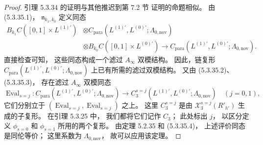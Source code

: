 \begin{proof}
引理 5.3.34 的证明与其他推迟到第 7.2 节
证明的命题相似。
由 (5.3.35.1)，
$\mathfrak n_{k_1,k_0}$ 定义同态
\begin{equation}
\begin{aligned}
B_{k_1}C([0,1]\times L^{(1)\prime})
&\otimes
C_{\mathrm{para}}
(L^{(1)\prime},L^{(0)\prime};
\Lambda_{0,\mathrm{nov}})\\
&\otimes
B_{k_0}C([0,1]\times L^{(0)\prime})
\longrightarrow
C_{\mathrm{para}}
(L^{(1)\prime},L^{(0)\prime};
\Lambda_{0,\mathrm{nov}}).
\end{aligned}
\tag{5.3.36}\label{eq:5-3-36}
\end{equation}
直接检查可知，
这些同态构成一个滤过
$A_\infty$ 双模结构。
因此，链复形
$C_{\mathrm{para}}
(L^{(1)\prime},L^{(0)\prime};
\Lambda_{0,\mathrm{nov}})$
上已有所需的滤过双模结构。
又由 (5.3.35.2)、(5.3.35.3)，
存在滤过 $A_\infty$ 双模同态
\[
\operatorname{Eval}_{s=j}\colon
C_{\mathrm{para}}
(L^{(1)\prime},L^{(0)\prime};
\Lambda_{0,\mathrm{nov}})
\longrightarrow
C_3^{s=j}
(L^{(1)\prime},L^{(0)\prime};
\Lambda_{0,\mathrm{nov}})
\quad(j=0,1),
\]
它们分别立于
$(\operatorname{Eval}_{s=j},
\operatorname{Eval}_{s=j})$ 之上。
这里 $C_3^{s=j}$ 是由
$\mathcal X_3^{s=j}(R'_{h'})$
生成的子复形。
在引理 5.3.25 中，
我们都将它们记作 $C_3$；
此处标出 $j$，
以区分定义 $\phi_{s=0}$
和 $\phi_{s=1}$ 所用的两个复形。
由定理 5.2.35 和 (5.3.35.4)，
上述评价同态是同伦等价；
这里系数为
$\Lambda_{0,\mathrm{nov}}$，
故可以应用该定理。


\end{proof}
